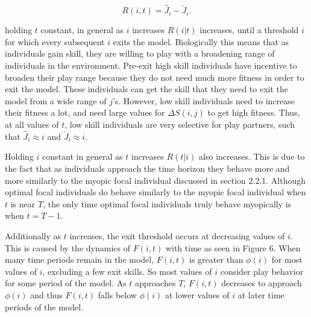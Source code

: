\documentclass[12pt,letterpaper]{article}
\begin{document}
      \begin{equation}
      R(i,t)=\hat J_i - \check J_{i}.
      \end{equation}
      
      holding $t$ constant, in general as $i$ increases $R(i|t)$ increases, until a threshold $i$ for which every subsequent $i$ exits the model.
      Biologically this means that as individuals gain skill, they are willing to play with a broadening range of individuals in the environment.
      Pre-exit high skill individuals have incentive to broaden their play range because they do not need much more fitness in order to exit the model.
      These individuals can get the skill that they need to exit the model from a wide range of $j$'s.
      However, low skill individuals need to increase their fitness a lot, and need large values for $\Delta S(i,j)$ to get high fitness.
      Thus, at all values of $t$, low skill individuals are very selective for play partners, such that $\hat J_i \approx i$ and $\check J_i \approx i$. 
      
      Holding $i$ constant in general as $t$ increases $R(t|i)$ also increases.
      This is due to the fact that as individuals approach the time horizon they behave more and more similarly to the myopic focal individual discussed in section 2.2.1. %
      Although optimal focal individuals do behave similarly to the myopic focal individual when $t$ is near $T$, the only time optimal focal individuals truly behave myopically is when $t=T-1$.   

      Additionally as $t$ increases, the exit threshold occurs at decreasing values of $i$. %
      This is caused by the dynamics of $F(i,t)$ with time as seen in Figure 6.
      When many time periods remain in the model, $F(i,t)$ is greater than $\phi(i)$ for most values of $i$, excluding a few exit skills.
      So most values of $i$ consider play behavior for some period of the model.
      As $t$ approaches $T$, $F(i,t)$ decreases to approach $\phi(i)$ and thus $F(i,t)$ falls below $\phi(i)$ at lower values of $i$ at later time periods of the model. 
         
         
      
      
      
\end{document}

